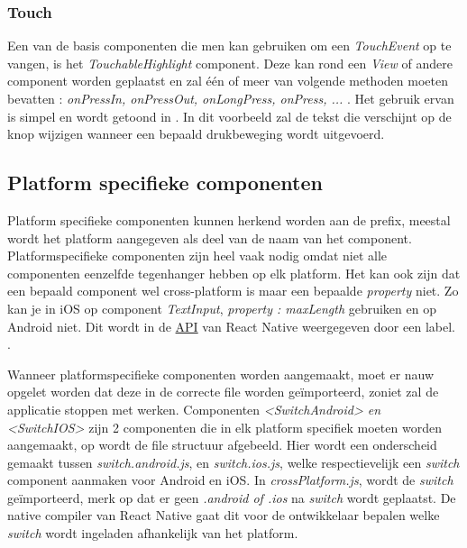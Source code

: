 
\subsubsection{Touch}
Een van de basis componenten die men kan gebruiken om een \emph{TouchEvent} op te vangen, is het \emph{TouchableHighlight} component. Deze kan rond een \emph{View} of andere component worden geplaatst en zal één of meer van volgende methoden moeten bevatten : \emph{onPressIn, onPressOut, onLongPress, onPress, ...} . Het gebruik ervan is simpel en wordt getoond in . In dit voorbeeld zal de tekst die verschijnt op de knop wijzigen wanneer een bepaald drukbeweging wordt uitgevoerd.\citep{api:ReactNative}
	
		
		\subsection{Platform specifieke componenten}
Platform specifieke componenten kunnen herkend worden aan de prefix, meestal wordt het platform aangegeven als deel van de naam van het component. Platformspecifieke componenten zijn heel vaak nodig omdat niet alle componenten eenzelfde tegenhanger hebben op elk platform. Het kan ook zijn dat een bepaald component wel cross-platform is maar een bepaalde \emph{property} niet. Zo kan je in iOS op component \emph{TextInput}, \emph{property : maxLength} gebruiken en op Android niet. Dit wordt in de \hyperref[api]{API} van React Native weergegeven door een label. \citep{api:ReactNative}.

Wanneer platformspecifieke componenten worden aangemaakt, moet er nauw opgelet worden dat deze in de correcte file worden geïmporteerd, zoniet zal de applicatie stoppen met werken. Componenten \emph{<SwitchAndroid> en <SwitchIOS>} zijn 2 componenten die in elk platform specifiek moeten worden aangemaakt, op  wordt de file structuur afgebeeld. Hier wordt een onderscheid gemaakt tussen \emph{switch.android.js},  en \emph{switch.ios.js},  welke respectievelijk een \emph{switch} component aanmaken voor Android en iOS. In \emph{crossPlatform.js},  wordt de \emph{switch} geïmporteerd, merk op dat er geen \emph{.android of .ios} na \emph{switch} wordt geplaatst. De native compiler van React Native gaat dit voor de ontwikkelaar bepalen welke \emph{switch} wordt ingeladen afhankelijk van het platform.

